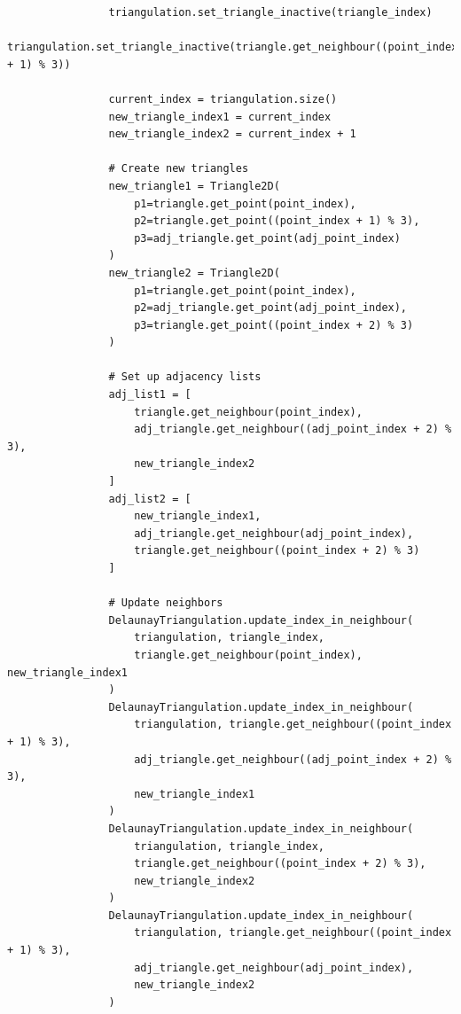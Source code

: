 \documentclass{article}
\begin{document}
\begin{lstlisting}
                triangulation.set_triangle_inactive(triangle_index)
                triangulation.set_triangle_inactive(triangle.get_neighbour((point_index + 1) % 3))
                
                current_index = triangulation.size()
                new_triangle_index1 = current_index
                new_triangle_index2 = current_index + 1
                
                # Create new triangles
                new_triangle1 = Triangle2D(
                    p1=triangle.get_point(point_index),
                    p2=triangle.get_point((point_index + 1) % 3),
                    p3=adj_triangle.get_point(adj_point_index)
                )
                new_triangle2 = Triangle2D(
                    p1=triangle.get_point(point_index),
                    p2=adj_triangle.get_point(adj_point_index),
                    p3=triangle.get_point((point_index + 2) % 3)
                )
                
                # Set up adjacency lists
                adj_list1 = [
                    triangle.get_neighbour(point_index),
                    adj_triangle.get_neighbour((adj_point_index + 2) % 3),
                    new_triangle_index2
                ]
                adj_list2 = [
                    new_triangle_index1,
                    adj_triangle.get_neighbour(adj_point_index),
                    triangle.get_neighbour((point_index + 2) % 3)
                ]
                
                # Update neighbors
                DelaunayTriangulation.update_index_in_neighbour(
                    triangulation, triangle_index,
                    triangle.get_neighbour(point_index), new_triangle_index1
                )
                DelaunayTriangulation.update_index_in_neighbour(
                    triangulation, triangle.get_neighbour((point_index + 1) % 3),
                    adj_triangle.get_neighbour((adj_point_index + 2) % 3),
                    new_triangle_index1
                )
                DelaunayTriangulation.update_index_in_neighbour(
                    triangulation, triangle_index,
                    triangle.get_neighbour((point_index + 2) % 3),
                    new_triangle_index2
                )
                DelaunayTriangulation.update_index_in_neighbour(
                    triangulation, triangle.get_neighbour((point_index + 1) % 3),
                    adj_triangle.get_neighbour(adj_point_index),
                    new_triangle_index2
                )
                

\end{lstlisting}
\end{document}
